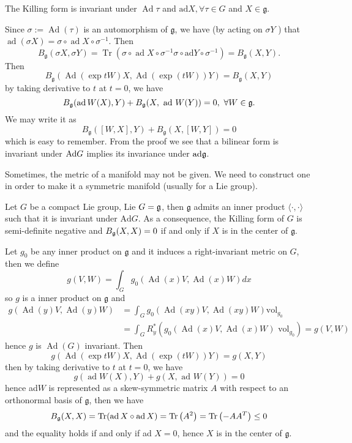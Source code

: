 \begin{theorem}
	The Killing form is invariant under $\operatorname{Ad} \tau$
	and $\mathrm{ad} X, \forall \tau \in G$ and $X \in
	\mathfrak{g}$.
	
\end{theorem}
\bproof
Since $\sigma := \operatorname{Ad}(\tau)$ is an automorphism of
$\mathfrak{g}$, we have (by acting on $\sigma Y$ ) that
$\operatorname{ad}(\sigma X) = \sigma \circ \operatorname{ad} X
\circ \sigma^{-1}$. Then
\[
B_{\mathfrak{g}}(\sigma X, \sigma Y) =
\operatorname{Tr}\left(\sigma \circ \operatorname{ad} X \circ
\sigma^{-1} \sigma \circ \mathrm{ad} Y \circ \sigma^{-1}\right) =
B_{\mathfrak{g}}(X, Y).
\]
Then
\[
B_{\mathfrak{g}}(\operatorname{Ad}(\exp t W) X,
\operatorname{Ad}(\exp (t W)) Y) = B_{\mathfrak{g}}(X, Y)
\]
 by taking derivative to $t$ at $t = 0$, we have
\[
B_{\mathfrak{g}}(\operatorname{ad} W(X), Y) + B_{\mathfrak{g}}(X,
\text { ad } W(Y)) = 0,\ \forall W \in {\mathfrak g}.
\]
We may write it as
\[
B_{\mathfrak{g}}([W, X], Y) + B_{\mathfrak{g}}(X, [W, Y]) = 0
\]
which is easy to remember.
\eproof
From the proof we see that a bilinear form is invariant under
$\mathrm{Ad} G$ implies its invariance under $\mathrm{ad}{\mathfrak g}$.

Sometimes, the metric of a manifold may not be given. We need to
construct one in order to make it a symmetric manifold (usually
for a Lie group).

\begin{lemma}
Let $G$ be a compact Lie group, Lie $G = {\mathfrak g}$, then
$\mathfrak{g}$ admits an inner product $\langle\cdot,
\cdot\rangle$ such that it is invariant under $\mathrm{Ad} {G}$.
As a consequence, the
Killing form of $G$ is semi-definite negative and $B_{{\mathfrak g}}(X, X)
= 0$ if and only if $X$ is in the center of $\mathfrak{g}$.	
\end{lemma}
\bproof
Let $g_{0}$ be any inner product on $\mathfrak{g}$ and it induces
a right-invariant metric on
$G$, then we define
\[
g(V, W) = \int_{G} g_{0}(\operatorname{Ad}(x) V,
\operatorname{Ad}(x) W) d x
\]
so $g$ is a inner product on $\mathfrak{g}$ and
\[
\begin{aligned}
	g(\operatorname{Ad}(y) V, \operatorname{Ad}(y) W) & =
	\int_{G} g_{0}(\operatorname{Ad}(x y) V, \operatorname{Ad}(x
	y) W)\mathrm{vol}_{g_{0}} \\
	& = \int_G R_{y}^{*}\left( g_{0}(\operatorname{Ad}(x) V,
	\operatorname{Ad}(x) W) \text { vol}_{g_{0}} \right) = g(V,
	{W})
\end{aligned}
\]
hence $g$ is $\operatorname{Ad}(G)$ invariant. Then
\[
g(\operatorname{Ad}(\exp t W) X, \operatorname{Ad}(\exp (t W)) Y)
= g(X, Y)
\]
then by taking derivative to $t$ at $t=0$, we have
\[
g(\operatorname{ad} W(X), Y)+g(X, \text { ad } W(Y)) = 0
\]
hence ad$W$ is represented as a skew-symmetric matrix $A$ with
respect to an
orthonormal basis of $\mathfrak{g}$, then we have
\[
B_{{\mathfrak g}}(X, X) = \operatorname{Tr}(\operatorname{ad} X \circ
\operatorname{ad} X)=\operatorname{Tr}\left(A^{2}\right) =
\operatorname{Tr}\left(-A A^{T}\right) \leq 0
\]
and the equality holds if and only if ad $X=0$, hence $X$ is in
the center of $\mathfrak{g}$.
\eproof

